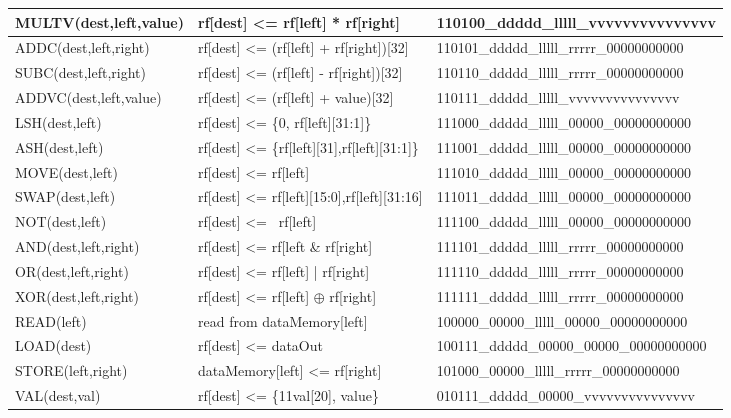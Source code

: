 \begin{table}[H]
\begin{longtable}{|l|l|l|}
      MULTV(dest,left,value)   & rf[dest] <= rf[left] * rf[right]               & 110100\_ddddd\_lllll\_vvvvvvvvvvvvvvv     \\ \hline
      ADDC(dest,left,right)  & rf[dest] <= (rf[left] + rf[right])[32]           & 110101\_ddddd\_lllll\_rrrrr\_00000000000  \\ \hline
      SUBC(dest,left,right)  & rf[dest] <= (rf[left] - rf[right])[32]           & 110110\_ddddd\_lllll\_rrrrr\_00000000000  \\ \hline
      ADDVC(dest,left,value)  & rf[dest] <= (rf[left] + value)[32]              & 110111\_ddddd\_lllll\_vvvvvvvvvvvvvvv     \\ \hline
      LSH(dest,left)        & rf[dest] <= \{0, rf[left][31:1]\}                 & 111000\_ddddd\_lllll\_00000\_00000000000  \\ \hline
      ASH(dest,left)        & rf[dest] <= \{rf[left][31],rf[left][31:1]\}       & 111001\_ddddd\_lllll\_00000\_00000000000  \\ \hline
      MOVE(dest,left)       & rf[dest] <= rf[left]                              & 111010\_ddddd\_lllll\_00000\_00000000000  \\ \hline
      SWAP(dest,left)       & rf[dest] <= {rf[left][15:0],rf[left][31:16]}      & 111011\_ddddd\_lllll\_00000\_00000000000  \\ \hline
      NOT(dest,left)        & rf[dest] <= ~rf[left]                             & 111100\_ddddd\_lllll\_00000\_00000000000  \\ \hline
      AND(dest,left,right)    & rf[dest] <= rf[left \& rf[right]                & 111101\_ddddd\_lllll\_rrrrr\_00000000000  \\ \hline
      OR(dest,left,right)     & rf[dest] <= rf[left] | rf[right]                & 111110\_ddddd\_lllll\_rrrrr\_00000000000  \\ \hline
      XOR(dest,left,right)    & rf[dest] <= rf[left] $\oplus$ rf[right]         & 111111\_ddddd\_lllll\_rrrrr\_00000000000  \\ \hline
      READ(left)            & read from dataMemory[left]                        & 100000\_00000\_lllll\_00000\_00000000000  \\ \hline
      LOAD(dest)            & rf[dest] <= dataOut                               & 100111\_ddddd\_00000\_00000\_00000000000  \\ \hline
      STORE(left,right)     & dataMemory[left] <= rf[right]                     & 101000\_00000\_lllll\_rrrrr\_00000000000  \\ \hline
      VAL(dest,val)         & rf[dest] <= \{{11{val[20]}}, value\}              & 010111\_ddddd\_00000\_vvvvvvvvvvvvvvv     \\ \hline
\end{longtable}
\end{table}

